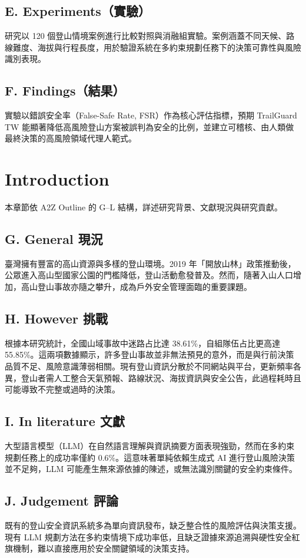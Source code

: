 \documentclass[12pt,a4paper]{article}
\begin{document}
\subsection*{E. Experiments（實驗）}
研究以 120 個登山情境案例進行比較對照與消融組實驗。案例涵蓋不同天候、路線難度、海拔與行程長度，用於驗證系統在多約束規劃任務下的決策可靠性與風險識別表現。

\subsection*{F. Findings（結果）}
實驗以錯誤安全率（False-Safe Rate, FSR）作為核心評估指標，預期 TrailGuard TW 能顯著降低高風險登山方案被誤判為安全的比例，並建立可稽核、由人類做最終決策的高風險領域代理人範式。

\section{Introduction}
本章節依 A2Z Outline 的 G–L 結構，詳述研究背景、文獻現況與研究貢獻。

\subsection*{G. General 現況}
臺灣擁有豐富的高山資源與多樣的登山環境。2019 年「開放山林」政策推動後，公眾進入高山型國家公園的門檻降低，登山活動愈發普及。然而，隨著入山人口增加，高山登山事故亦隨之攀升，成為戶外安全管理面臨的重要課題。

\subsection*{H. However 挑戰}
根據本研究統計，全國山域事故中迷路占比達 38.61\%，自組隊伍占比更高達 55.85\%。這兩項數據顯示，許多登山事故並非無法預見的意外，而是與行前決策品質不足、風險意識薄弱相關。現有登山資訊分散於不同網站與平台，更新頻率各異，登山者需人工整合天氣預報、路線狀況、海拔資訊與安全公告，此過程耗時且可能導致不完整或過時的決策。

\subsection*{I. In literature 文獻}
大型語言模型（LLM）在自然語言理解與資訊摘要方面表現強勁，然而在多約束規劃任務上的成功率僅約 0.6\%。這意味著單純依賴生成式 AI 進行登山風險決策並不足夠，LLM 可能產生無來源依據的陳述，或無法識別關鍵的安全約束條件。

\subsection*{J. Judgement 評論}
既有的登山安全資訊系統多為單向資訊發布，缺乏整合性的風險評估與決策支援。現有 LLM 規劃方法在多約束情境下成功率低，且缺乏證據來源追溯與硬性安全紅旗機制，難以直接應用於安全關鍵領域的決策支持。
\end{document}
